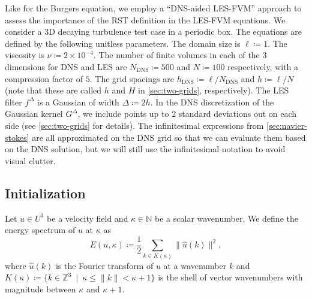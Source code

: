 \documentclass[preprint,twocolumn,5p]{elsarticle}
\begin{document}
Like for the Burgers equation, we employ a ``DNS-aided LES-FVM'' approach to
assess the importance of the RST definition in the LES-FVM equations.
We consider a 3D decaying turbulence test case in a periodic box.
The equations are defined by the following unitless parameters.
The domain size is $\ell \coloneq 1$.
The viscosity is $\nu \coloneq 2 \times 10^{-4}$.
The number of finite volumes in each of the 3 dimensions for DNS and LES are
$N_\text{DNS} \coloneq 500$ and $N \coloneq 100$
respectively, with a compression factor of $5$.
The grid spacings are $h_\text{DNS} \coloneq \ell / N_\text{DNS}$ and $h \coloneq \ell / N$
(note that these are called $h$ and $H$ in \ref{sec:two-grids}, respectively).
The LES filter $f^\Delta$ is a Gaussian of width $\Delta \coloneq 2 h$.
In the DNS discretization of the Gaussian kernel $G^\Delta$, we include points
up to $2$ standard deviations out on each side (see \ref{sec:two-grids} for details).
The infinitesimal expressions from \cref{sec:navier-stokes} are all approximated
on the DNS grid so that we can evaluate them based on the DNS solution,
but we will still use the infinitesimal notation to avoid visual clutter.

\subsection{Initialization}

Let $u \in U^3$ be a velocity field and $\kappa \in \mathbb{N}$ be a scalar
wavenumber.
We define the energy spectrum of $u$ at $\kappa$ as
\begin{equation} \label{eq:ns-spectrum}
    E(u, \kappa) \coloneq \frac{1}{2}
    \sum_{k \in K(\kappa)}
    \| \hat{u}(k) \|^2,
\end{equation}
where $\hat{u}(k)$ is the Fourier transform of $u$ at a wavenumber $k$ and 
$K(\kappa) \coloneq \{ k \in \mathbb{Z}^3 \ \mid
\ \kappa \leq \| k \| < \kappa + 1 \}$
is the shell of vector wavenumbers with magnitude
between $\kappa$ and $\kappa + 1$.
\end{document}
